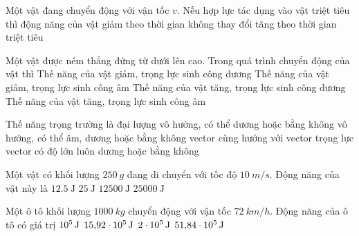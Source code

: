 \begin{ex}
Một vật đang chuyển động với vận tốc $v$. Nếu hợp lực tác dụng vào vật triệt tiêu thì động năng của vật	
	\choice
	{giảm theo thời gian}
	{\True không thay đổi}
	{tăng theo thời gian}
	{triệt tiêu}
	\loigiai{}
\end{ex}
\begin{ex}
	Một vật được ném thẳng đứng từ dưới lên cao. Trong quá trình chuyển động của vật thì
	\choice
	{Thế năng của vật giảm, trọng lực sinh công dương}
	{Thế năng của vật giảm, trọng lực sinh công âm}
	{Thế năng của vật tăng, trọng lực sinh công dương}
	{\True Thế năng của vật tăng, trọng lực sinh công âm}
\end{ex}
\begin{ex}
	Thế năng trọng trường là đại lượng	
	\choice
	{vô hướng, có thể dương hoặc bằng không}
	{\True vô hướng, có thể âm, dương hoặc bằng không}
	{vector cùng hướng với vector trọng lực}
	{vector có độ lớn luôn dương hoặc bằng không}
\end{ex}
\begin{ex}
	Một vật có khối lượng $\SI{250}{g}$ đang di chuyển với tốc độ $\SI{10}{m/s}$. Động năng của vật này là
	\choice
	{\True $\SI{12.5}{\joule}$}
	{$\SI{25}{\joule}$}
	{$\SI{12500}{\joule}$}
	{$\SI{25000}{\joule}$}
\end{ex}
\begin{ex}
	Một ô tô khối lượng $\SI{1000}{kg}$ chuyển động với vận tốc $\SI{72}{km/h}$. Động năng của ô tô có giá trị
	\choice
	{$\xsi{10^5}{J}$}
	{$\text{15,92}\xsi{\cdot 10^5}{J}$}
	{\True $\xsi{2\cdot 10^5}{J}$}
	{$\text{51,84}\xsi{\cdot 10^5}{J}$}
\end{ex}
